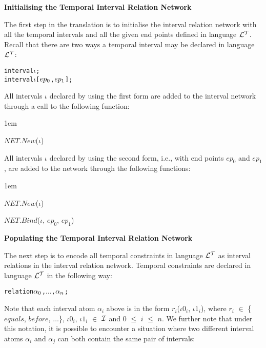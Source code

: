 \documentclass[11pt]{report}
\newenvironment{vverbatim}
{
  \begin{alltt}
}
{
  \vspace{-\baselineskip}
  \end{alltt}
}
\newenvironment{vquote}
{
  \begin{list}{}{\leftmargin 1em}\item[]
}
{
  \end{list}
}
\begin{document}
          \begin{itemize}

            \item
              {\bf Initialising the Temporal Interval Relation Network}

              The first step in the translation is to initialise the interval
              relation network with all the temporal intervals and all the
              given end points defined in language ${\cal L^T}$. Recall that
              there are two ways a temporal interval may be declared in
              language ${\cal L^T}$:

              \begin{vverbatim}
  interval \(\iota\);
  interval \(\iota\) [\(ep\sb{0}\), \(ep\sb{1}\)];
              \end{vverbatim}

              All intervals $\iota$ declared by using the first form are added
              to the interval network through a call to the following function:

              \begin{vquote}
                $NET.New$($\iota$)
              \end{vquote}

              All intervals $\iota$ declared by using the second form, i.e.,
              with end points $ep_0$ and $ep_1$, are added to the network
              through the following functions:

              \begin{vquote}
                $NET.New$($\iota$)

                $NET.Bind$($\iota$, $ep_0$, $ep_1$)
              \end{vquote}

            \item
              {\bf Populating the Temporal Interval Relation Network}

              The next step is to encode all temporal constraints in
              language ${\cal L^T}$ as interval relations in the interval
              relation network. Temporal constraints are declared in language
              ${\cal L^T}$ in the following way:

              \begin{vverbatim}
  relation \(\alpha\sb{0}\), \(\ldots\), \(\alpha\sb{n}\);
              \end{vverbatim}

              Note that each interval atom ${\alpha}_i$ above is in the form
              $r_i$(${\iota}0_i$, ${\iota}1_i$), where $r_i$ $\in$ \{$equals$,
              $before$, $\ldots$\}, ${\iota}0_i$, ${\iota}1_i$ $\in$
              ${\cal I}$ and $0$ $\leq$ $i$ $\leq$ $n$. We further note that
              under this notation, it is possible to encounter a situation
              where two different interval atoms ${\alpha}_i$ and ${\alpha}_j$
              can both contain the same pair of intervals:


\end{itemize}
\end{document}
